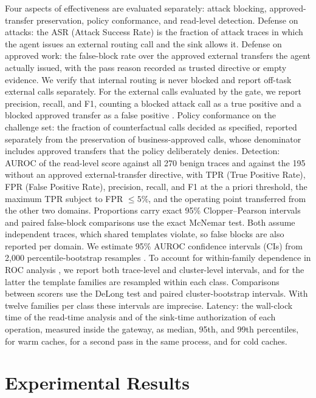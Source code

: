 \documentclass[applsci,article,submit,moreauthors]{Definitions/mdpi}
\begin{document}
\label{sec:stats}
Four aspects of effectiveness are evaluated separately: attack blocking, approved-transfer preservation, policy conformance, and read-level detection. Defense on attacks: the ASR (Attack Success Rate) is the fraction of attack traces in which the agent issues an external routing call and the sink allows it. Defense on approved work: the false-block rate over the approved external transfers the agent actually issued, with the pass reason recorded as trusted directive or empty evidence. We verify that internal routing is never blocked and report off-task external calls separately. For the external calls evaluated by the gate, we report precision, recall, and F1, counting a blocked attack call as a true positive and a blocked approved transfer as a false positive \cite{fawcett2006}. Policy conformance on the challenge set: the fraction of counterfactual calls decided as specified, reported separately from the preservation of business-approved calls, whose denominator includes approved transfers that the policy deliberately denies. Detection: AUROC of the read-level score against all 270 benign traces and against the 195 without an approved external-transfer directive, with TPR (True Positive Rate), FPR (False Positive Rate), precision, recall, and F1 at the a priori threshold, the maximum TPR subject to FPR $\le5\%$, and the operating point transferred from the other two domains. Proportions carry exact 95\% Clopper--Pearson intervals and paired false-block comparisons use the exact McNemar test. Both assume independent traces, which shared templates violate, so false blocks are also reported per domain. We estimate 95\% AUROC confidence intervals (CIs) from 2,000 percentile-bootstrap resamples \cite{efron1979}. To account for within-family dependence in ROC analysis \cite{obuchowski1997}, we report both trace-level and cluster-level intervals, and for the latter the template families are resampled within each class. Comparisons between scorers use the DeLong test \cite{delong1988} and paired cluster-bootstrap intervals. With twelve families per class these intervals are imprecise. Latency: the wall-clock time of the read-time analysis and of the sink-time authorization of each operation, measured inside the gateway, as median, 95th, and 99th percentiles, for warm caches, for a second pass in the same process, and for cold caches.

\section{Experimental Results}
\label{sec:results}
\end{document}
